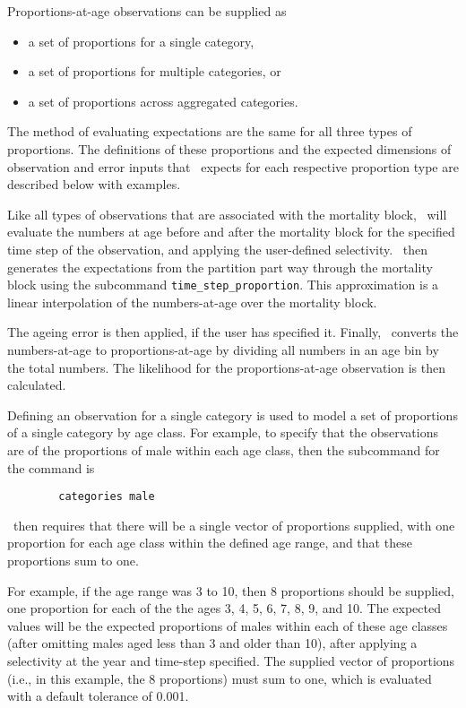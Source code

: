 Proportions-at-age observations can be supplied as

\begin{itemize}
	\item a set of proportions for a single category,
	\item a set of proportions for multiple categories, or
	\item a set of proportions across aggregated categories.
\end{itemize}

The method of evaluating expectations are the same for all three types of proportions. The definitions of these proportions and the expected dimensions of observation and error inputs that \CNAME\ expects for each respective proportion type are described below with examples.

Like all types of observations that are associated with the mortality block, \CNAME\ will evaluate the numbers at age before and after the mortality block for the specified time step of the observation, and applying the user-defined selectivity. \CNAME\ then generates the expectations from the partition part way through the mortality block using the subcommand \texttt{time\_step\_proportion}. This approximation is a linear interpolation of the numbers-at-age over the mortality block.

The ageing error is then applied, if the user has specified it. Finally, \CNAME\ converts the numbers-at-age to proportions-at-age by dividing all numbers in an age bin by the total numbers. The likelihood for the proportions-at-age observation is then calculated.

Defining an observation for a single category is used to model a set of proportions of a single category by age class. For example, to specify that the observations are of the proportions of male within each age class, then the subcommand  for the  command is

{\small{\begin{verbatim}
		categories male
		\end{verbatim}}}

\CNAME\ then requires that there will be a single vector of proportions supplied, with one proportion for each age class within the defined age range, and that these proportions sum to one.

For example, if the age range was 3 to 10, then 8 proportions should be supplied, one proportion for each of the the ages 3, 4, 5, 6, 7, 8, 9, and 10. The expected values will be the expected proportions of males within each of these age classes (after omitting males aged less than 3 and older than 10), after applying a selectivity at the year and time-step specified. The supplied vector of proportions (i.e., in this example, the 8 proportions) must sum to one, which is evaluated with a default tolerance of 0.001.

